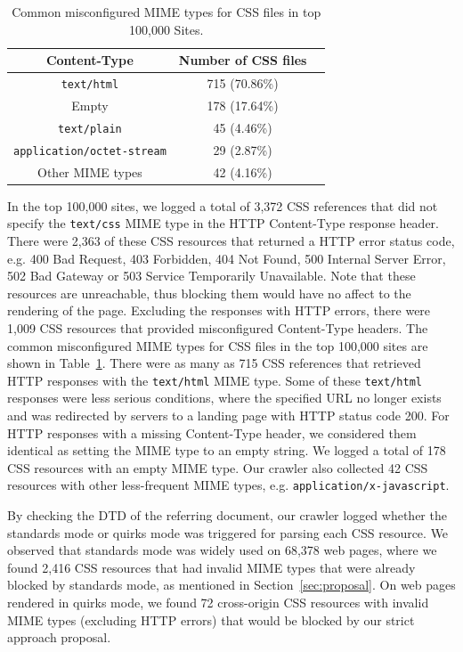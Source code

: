 \documentclass{acm_proc_article-sp}
\begin{document}
\begin{table}
\centering
\begin{tabular}{|c|c|c|} \hline
Content-Type&Number of CSS files\\ \hline
\texttt{text/html}&715 (70.86\%)\\ \hline
Empty &178 (17.64\%)\\ \hline
\texttt{text/plain}&45 (4.46\%)\\ \hline
\texttt{application/octet-stream}&29 (2.87\%)\\ \hline
Other MIME types&42 (4.16\%)\\
\hline\end{tabular}
\caption{Common misconfigured MIME types for CSS files in top 100,000 Sites.}
\label{table:MIME}
\end{table}

In the top 100,000 sites, we logged a total of 3,372 CSS references that did not specify the \verb|text/css| MIME type in the HTTP Content-Type response header. There were 2,363 of these CSS resources that returned a HTTP error status code, e.g. 400 Bad Request, 403 Forbidden, 404 Not Found, 500 Internal Server Error, 502 Bad Gateway or 503 Service Temporarily Unavailable. Note that these resources are unreachable, thus blocking them would have no affect to the rendering of the page. Excluding the responses with HTTP errors, there were 1,009 CSS resources that provided misconfigured Content-Type headers. The common misconfigured MIME types for CSS files in the top 100,000 sites are shown in Table~\ref{table:MIME}. There were as many as 715 CSS references that retrieved HTTP responses with the \verb|text/html| MIME type. Some of these \texttt{text/html} responses were less serious conditions, where the specified URL no longer exists and was redirected by servers to a landing page with HTTP status code 200. For HTTP responses with a missing Content-Type header, we considered them identical as setting the MIME type to an empty string. We logged a total of 178 CSS resources with an empty MIME type. Our crawler also collected 42 CSS resources with other less-frequent MIME types, e.g. \verb|application/x-javascript|. 

By checking the DTD of the referring document, our crawler logged whether the standards mode or quirks mode was triggered for parsing each CSS resource. We observed that standards mode was widely used on 68,378 web pages, where we found 2,416 CSS resources that had invalid MIME types that were already blocked by standards mode, as mentioned in Section~\ref{sec:proposal}. On web pages rendered in quirks mode, we found 72 cross-origin CSS resources with invalid MIME types (excluding HTTP errors) that would be blocked by our strict approach proposal.
\end{document}
